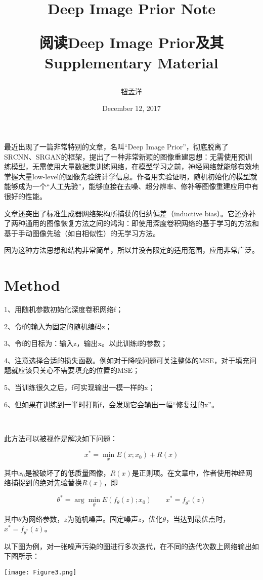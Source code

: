 \documentclass[10pt, letterpaper]{article}
\title{Deep Image Prior Note\\[1ex]\begin{large}阅读Deep Image Prior及其Supplementary Material\end{large}}
\author{钮孟洋}
\date{December 12, 2017}
\begin{document}
\maketitle{}

最近出现了一篇非常特别的文章，名叫“Deep Image Prior”，彻底脱离了SRCNN、SRGAN的框架，提出了一种非常新颖的图像重建思想：无需使用预训练模型，无需使用大量数据集训练网络，在模型学习之前，神经网络就能够有效地掌握大量low-level的图像先验统计学信息。作者用实验证明，随机初始化的模型就能够成为一个“人工先验”，能够直接在去噪、超分辨率、修补等图像重建应用中有很好的性能。

文章还突出了标准生成器网络架构所捕获的归纳偏差（inductive bias）。它还弥补了两种通用的图像恢复方法之间的鸿沟：即使用深度卷积网络的基于学习的方法和基于手动图像先验（如自相似性）的无学习方法。

因为这种方法思想和结构非常简单，所以并没有限定的适用范围，应用非常广泛。

\section{Method}

1、用随机参数初始化深度卷积网络f；\par
2、令f的输入为固定的随机编码z；\par
3、令f的目标为：输入z，输出x。以此训练f的参数；\par
4、注意选择合适的损失函数。例如对于降噪问题可关注整体的MSE，对于填充问题就应该只关心不需要填充的位置的MSE；\par
5、当训练很久之后，f可实现输出一模一样的x；\par
6、但如果在训练到一半时打断f，会发现它会输出一幅“修复过的x”。\par
~\par
此方法可以被视作是解决如下问题：

$$
x^*=\min_{x}E(x;x_0)+R(x)
$$

其中$x_0$是被破坏了的低质量图像，$R(x)$是正则项。在文章中，作者使用神经网络捕捉到的绝对先验替换$R(x)$，即

$$
\theta^*=\arg\min_{\theta}E(f_\theta(z);x_0)\qquad x^*=f_{\theta^*}(z)
$$

其中$\theta$为网络参数，$z$为随机噪声。固定噪声$z$，优化$\theta$，当达到最优点时，$x^*=f_{\theta^*}(z)$。

以下图为例，对一张噪声污染的图进行多次迭代，在不同的迭代次数上网络输出如下图所示：

\begin{center}
\texttt{[image: Figure3.png]}
\end{center}\par
\end{document}
